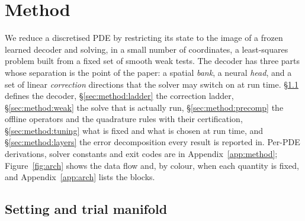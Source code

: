 %
%
%

\section{Method}
\label{sec:method}

We reduce a discretised PDE by restricting its state to the image of a frozen
learned decoder and solving, in a small number of coordinates, a least-squares
problem built from a fixed set of smooth weak tests. The decoder has three parts
whose separation is the point of the paper: a spatial \emph{bank}, a neural
\emph{head}, and a set of linear \emph{correction} directions that the solver may
switch on at run time. \S\ref{sec:method:manifold} defines the decoder,
\S\ref{sec:method:ladder} the correction ladder, \S\ref{sec:method:weak} the
solve that is actually run, \S\ref{sec:method:precomp} the offline operators and
the quadrature rules with their certification, \S\ref{sec:method:tuning} what is
fixed and what is chosen at run time, and \S\ref{sec:method:layers} the error
decomposition every result is reported in. Per-PDE derivations, solver constants
and exit codes are in Appendix~\ref{app:method}; Figure~\ref{fig:arch} shows
the data flow and, by colour, when each quantity is fixed, and
Appendix~\ref{app:arch} lists the blocks.

\subsection{Setting and trial manifold}
\label{sec:method:manifold}

